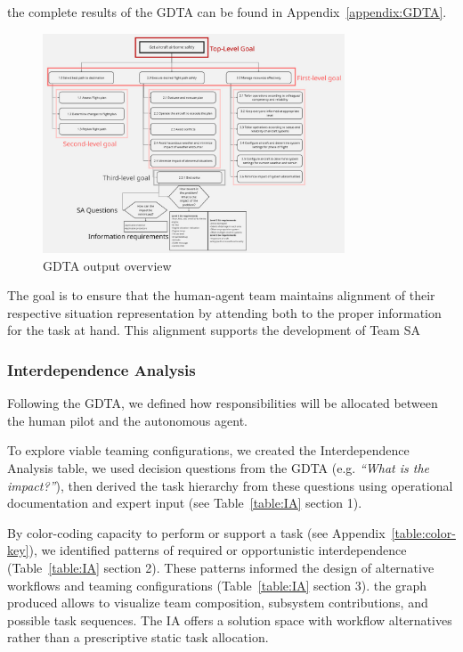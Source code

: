 \documentclass[12pt,a4paper]{article} %
\begin{document}
	the complete results of the GDTA can be found in Appendix~\ref{appendix:GDTA}.

	\begin{figure}[H]
		\centering
		\includegraphics[width=0.8\textwidth]{./images/gdta}
		\caption{GDTA output overview}
		\label{fig:gdta}
	\end{figure}

	The goal is to ensure that the human-agent team maintains alignment of their respective situation representation by attending both to the proper information for the task at hand. This alignment supports the development of Team SA
	
	\subsubsection{Interdependence Analysis}

	Following the GDTA, we defined how responsibilities will be allocated between the human pilot and the autonomous agent.

	To explore viable teaming configurations, we created the Interdependence Analysis table, we used decision questions from the GDTA (e.g. \emph{“What is the impact?”}), then derived the task hierarchy from these questions using operational documentation and expert input (see Table~\ref{table:IA} section 1).
	
	By color-coding capacity to perform or support a task (see Appendix~\ref{table:color-key}), we identified patterns of required or opportunistic interdependence (Table~\ref{table:IA} section 2). These patterns informed the design of alternative workflows and teaming configurations (Table~\ref{table:IA} section 3). the graph produced allows to visualize team composition, subsystem contributions, and possible task sequences. The IA offers a solution space with workflow alternatives rather than a prescriptive static task allocation.
\end{document}
